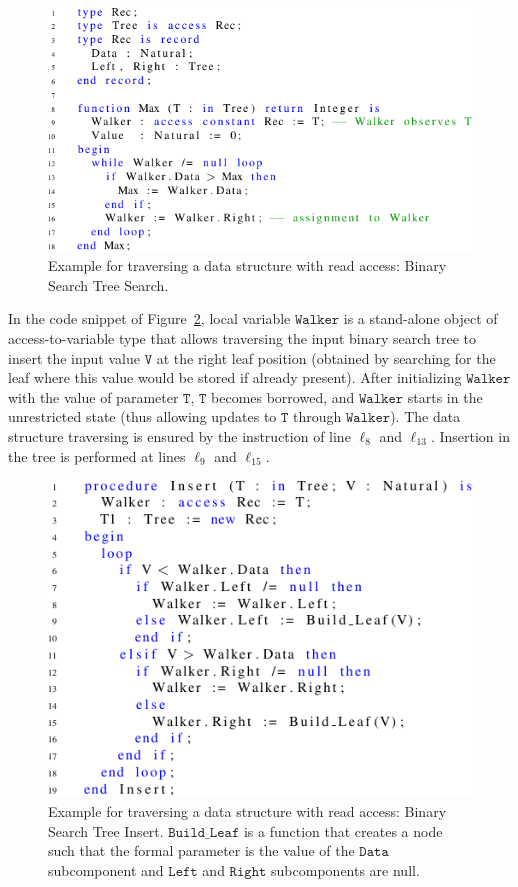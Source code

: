 \documentclass{llncs}
\newcommand\var[1]{\ensuremath{\mathtt{#1}}}
\begin{document}
\begin{figure}[htb!]
\centering
  \captionsetup{justification=centering,margin=0.6cm}
   \includegraphics[]{maxTree}
   \caption{Example for traversing a data structure with read access: Binary Search Tree Search.}
   \label{fig:maxTree}
\end{figure}


In the code snippet of Figure~\ref{fig:treeInsert}, local variable \var{Walker} is a stand-alone object of access-to-variable type that allows traversing the input binary
search tree to insert the input value \var{V} at the right leaf position (obtained by searching for the leaf where this value would be stored if already present).
After initializing \var{Walker} with the value of parameter \var{T}, \var{T} becomes borrowed, and \var{Walker} starts in the unrestricted state (thus allowing updates to \var{T} through \var{Walker}).
The data structure traversing is ensured by the instruction of line $\ell_8$ and $\ell_{13}$. Insertion in the tree is performed at lines
$\ell_9$ and $\ell_{15}$.


\begin{figure}[htb!]
\centering
  \captionsetup{justification=centering,margin=0.6cm}
   \includegraphics[]{treeInsert}
   \caption{Example for traversing a data structure with read access: Binary Search Tree Insert. \var{Build\_Leaf} is a function that creates a node such that the formal
	parameter is the value of the \var{Data} subcomponent and \var{Left} and \var{Right} subcomponents are null.}
   \label{fig:treeInsert}
\end{figure}
\end{document}
